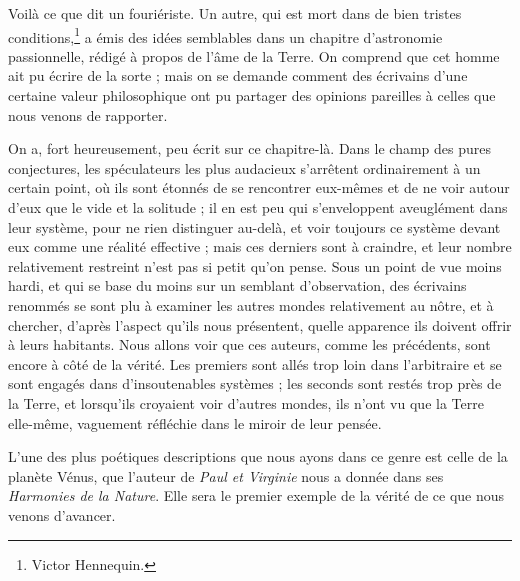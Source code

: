 \documentclass[a4paper, 11pt, oneside, landscape]{article}
\begin{document}
Voilà ce que dit un fouriériste. Un autre, qui est mort dans de bien tristes conditions,\footnote{Victor Hennequin.} a émis des idées semblables dans un chapitre d'astronomie passionnelle, rédigé à propos de l'âme de la Terre. On comprend que cet homme ait pu écrire de la sorte ; mais on se demande comment des écrivains d'une certaine valeur philosophique ont pu partager des opinions pareilles à celles que nous venons de rapporter.

On a, fort heureusement, peu écrit sur ce chapitre-là. Dans le champ des pures conjectures, les spéculateurs les plus audacieux s'arrêtent ordinairement à un certain point, où ils sont étonnés de se rencontrer eux-mêmes et de ne voir autour d'eux que le vide et la solitude ; il en est peu qui s'enveloppent aveuglément dans leur système, pour ne rien distinguer au-delà, et voir toujours ce système devant eux comme une réalité effective ; mais ces derniers sont à craindre, et leur nombre relativement restreint n'est pas si petit qu'on pense. Sous un point de vue moins hardi, et qui se base du moins sur un semblant d'observation, des écrivains renommés se sont plu à examiner les autres mondes relativement au nôtre, et à chercher, d'après l'aspect qu'ils nous présentent, quelle apparence ils doivent offrir à leurs habitants. Nous allons voir que ces auteurs, comme les précédents, sont encore à côté de la vérité. Les premiers sont allés trop loin dans l'arbitraire et se sont engagés dans d'insoutenables systèmes ; les seconds sont restés trop près de la Terre, et lorsqu'ils croyaient voir d'autres mondes, ils n'ont vu que la Terre elle-même, vaguement réfléchie dans le miroir de leur pensée.

L'une des plus poétiques descriptions que nous ayons dans ce genre est celle de la planète Vénus, que l'auteur de \emph{Paul et Virginie} nous a donnée dans ses \emph{Harmonies de la Nature}. Elle sera le premier exemple de la vérité de ce que nous venons d'avancer.
\end{document}
